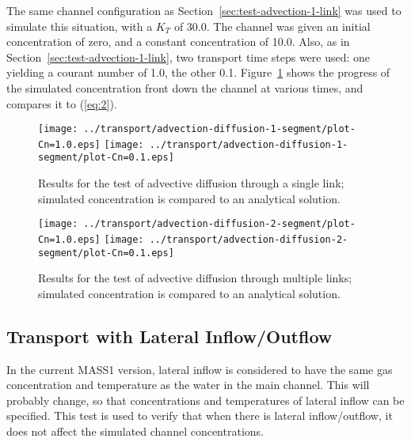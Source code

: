 \documentclass[12pt,dvips,letterpaper]{article}
\begin{document}
The same channel configuration as
Section~\ref{sec:test-advection-1-link} was used to simulate this
situation, with a $K_{T}$ of 30.0.  The channel was given an initial
concentration of zero, and a constant concentration of 10.0. Also, as
in Section~\ref{sec:test-advection-1-link}, two transport time steps
were used: one yielding a courant number of 1.0, the other 0.1.
Figure~\ref{fig:test-advection-diffusion-1-results} shows the progress
of the simulated concentration front down the channel at various
times, and compares it to (\ref{eq:2}).


\begin{figure}[htbp]
  \begin{center}
    \texttt{[image: ../transport/advection-diffusion-1-segment/plot-Cn=1.0.eps]}
    \texttt{[image: ../transport/advection-diffusion-1-segment/plot-Cn=0.1.eps]}
    \caption{Results for the test of advective diffusion through a single link;
      simulated concentration is compared to an analytical solution.}
    \label{fig:test-advection-diffusion-1-results}
  \end{center}
\end{figure}


\begin{figure}[htbp]
  \begin{center}
    \texttt{[image: ../transport/advection-diffusion-2-segment/plot-Cn=1.0.eps]}
    \texttt{[image: ../transport/advection-diffusion-2-segment/plot-Cn=0.1.eps]}
    \caption{Results for the test of advective diffusion through multiple links;
      simulated concentration is compared to an analytical solution.}
    \label{fig:test-advection-diffusion-2-results}
  \end{center}
\end{figure}


\subsection{Transport with Lateral Inflow/Outflow}
\label{sec:test-transport-lateral}

In the current MASS1 version, lateral inflow is considered to have the
same gas concentration and temperature as the water in the main
channel.  This will probably change, so that concentrations and
temperatures of lateral inflow can be specified.  This test is used to
verify that when there is lateral inflow/outflow, it does not affect
the simulated channel concentrations.  
\end{document}

